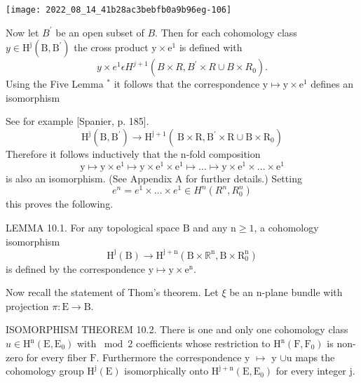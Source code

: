 \documentclass[10pt]{article}
\begin{document}
\texttt{[image: 2022\_08\_14\_41b28ac3bebfb0a9b96eg-106]}

Now let $B^{\prime}$ be an open subset of $B$. Then for each cohomology class $y \in \mathrm{H}^{\mathrm{j}}\left(\mathrm{B}, \mathrm{B}^{\prime}\right)$ the cross product $\mathrm{y} \times \mathrm{e}^{1}$ is defined with
$$
y \times e^{1} \epsilon H^{j+1}\left(B \times R, B^{\prime} \times R \cup B \times R_{0}\right) .
$$
Using the Five Lemma ${ }^{*}$ it follows that the correspondence $\mathrm{y} \mapsto \mathrm{y} \times \mathrm{e}^{1}$ defines an isomorphism

See for example [Spanier, p. 185].
$$
\mathrm{H}^{\mathrm{j}}\left(\mathrm{B}, \mathrm{B}^{\prime}\right) \rightarrow \mathrm{H}^{\mathrm{j}+1}\left(\mathrm{~B} \times \mathrm{R}, \mathrm{B}^{\prime} \times \mathrm{R} \cup \mathrm{B} \times \mathrm{R}_{0}\right)
$$
Therefore it follows inductively that the $\mathrm{n}$-fold composition
$$
\mathrm{y} \mapsto \mathrm{y} \times \mathrm{e}^{1} \mapsto \mathrm{y} \times \mathrm{e}^{1} \times \mathrm{e}^{1} \mapsto \ldots \mapsto \mathrm{y} \times \mathrm{e}^{1} \times \ldots \times \mathrm{e}^{1}
$$
is also an isomorphism. (See Appendix A for further details.) Setting
$$
e^{n}=e^{1} \times \ldots \times e^{1} \in H^{n}\left(R^{n}, R_{0}^{n}\right)
$$
this proves the following.

LEMMA 10.1. For any topological space $\mathrm{B}$ and any $\mathrm{n} \geq 1$, a cohomology isomorphism
$$
\mathrm{H}^{\mathrm{j}}(\mathrm{B}) \rightarrow \mathrm{H}^{\mathrm{j}+\mathrm{n}}\left(\mathrm{B} \times \mathbb{R}^{\mathrm{n}}, \mathrm{B} \times \mathrm{R}_{0}^{\mathrm{n}}\right)
$$
is defined by the correspondence $\mathrm{y} \mapsto \mathrm{y} \times \mathrm{e}^{\mathrm{n}}$.

Now recall the statement of Thom's theorem. Let $\xi$ be an n-plane bundle with projection $\pi: \mathrm{E} \rightarrow \mathrm{B}$.

ISOMORPHISM THEOREM 10.2. There is one and only one cohomology class $u \in \mathrm{H}^{\mathrm{n}}\left(\mathrm{E}, \mathrm{E}_{0}\right)$ with $\bmod 2$ coefficients whose restriction to $\mathrm{H}^{\mathrm{n}}\left(\mathrm{F}, \mathrm{F}_{0}\right)$ is non-zero for every fiber $\mathrm{F}$. Furthermore the correspondence y $\mapsto$ y $\cup \mathrm{u}$ maps the cohomology group $\mathrm{H}^{\mathrm{j}}(\mathrm{E})$ isomorphically onto $\mathrm{H}^{\mathrm{j}+\mathrm{n}}\left(\mathrm{E}, \mathrm{E}_{0}\right)$ for every integer $\mathrm{j}$.
\end{document}
